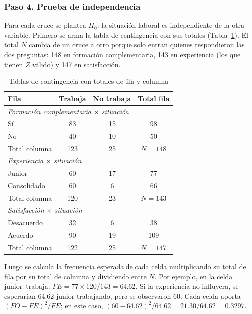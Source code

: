 \documentclass[12pt, a4paper]{article}
\newenvironment{mitabla}[2][H]{%
  \begin{table}[#1]
  \centering
  \caption{#2}
  \small
}{%
  \end{table}
}
\begin{document}
\subsubsection{Paso 4. Prueba de independencia}

Para cada cruce se plantea $H_0$: la situación laboral es independiente
de la otra variable. Primero se arma la tabla de contingencia con sus
totales (Tabla~\ref{tab:real-contingencia}). El total $N$ cambia de un
cruce a otro porque solo entran quienes respondieron las dos preguntas:
148 en formación complementaria, 143 en experiencia (los que tienen
$Z$ válido) y 147 en satisfacción.

\begin{mitabla}{Tablas de contingencia con totales de fila y columna}\label{tab:real-contingencia}
\begin{tabular}{lccc}
\toprule
\textbf{Fila} & \textbf{Trabaja} & \textbf{No trabaja} & \textbf{Total fila} \\
\midrule
\multicolumn{4}{l}{\textit{Formación complementaria $\times$ situación}} \\
Sí           & 83  & 15 & 98 \\
No           & 40  & 10 & 50 \\
Total columna & 123 & 25 & $N = 148$ \\
\midrule
\multicolumn{4}{l}{\textit{Experiencia $\times$ situación}} \\
Junior       & 60  & 17 & 77 \\
Consolidado  & 60  & 6  & 66 \\
Total columna & 120 & 23 & $N = 143$ \\
\midrule
\multicolumn{4}{l}{\textit{Satisfacción $\times$ situación}} \\
Desacuerdo   & 32  & 6  & 38 \\
Acuerdo      & 90  & 19 & 109 \\
Total columna & 122 & 25 & $N = 147$ \\
\bottomrule
\end{tabular}
\end{mitabla}

Luego se calcula la frecuencia esperada de cada celda multiplicando su
total de fila por su total de columna y dividiendo entre $N$. Por
ejemplo, en la celda junior--trabaja: $FE = 77 \times 120 / 143 = 64.62$.
Si la experiencia no influyera, se esperarían 64.62 junior trabajando,
pero se observaron 60. Cada celda aporta $(FO - FE)^2/FE$; en este caso,
$(60 - 64.62)^2/64.62 = 21.30/64.62 = 0.3297$.
\end{document}
